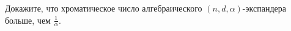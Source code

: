 Докажите, что хроматическое число алгебраического $(n, d, \alpha)$-экспандера больше, чем $\frac{1}{\alpha}$.